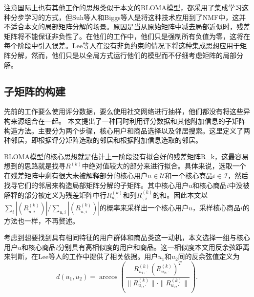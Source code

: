 注意国际上也有其他工作的思想类似于本文的BLOMA模型，都采用了集成学习这种分步学习的方式，但Suh等人和Biggs等人是将这种技术应用到了NMF中，这并不适合本文的局部矩阵分解的场景。原因是当从原始矩阵中减去局部近似时，残差矩阵将不能保证非负性了。在他们的工作中，他们只是强制所有负值为零，这将在每个阶段中引入误差。Lee等人在没有非负约束的情况下将这种集成思想应用于矩阵分解，然而，他们只是以全局方式运行他们的模型而不仔细考虑矩阵的局部分解。

\subsection{子矩阵的构建}
先前的工作要么使用评分数据，要么使用社交网络进行抽样，他们都没有将这些异构来源组合在一起。 本文提出了一种同时利用评分数据和其他附加信息的子矩阵构造方法。主要分为两个步骤，核心用户和商品选择以及邻居搜索。这里定义了两种邻居，即根据评分矩阵选取的邻居和根据附加信息选取的邻居。

BLOMA模型的核心思想就是估计上一阶段没有拟合好的残差矩阵\gls{R_k}，这最容易想到的思路就是找寻$R^{(k)}$中绝对值较大的部分来进行拟合。具体来说，选取一个在残差矩阵中剩有很大未被解释部分的核心用户$u \in \mathcal{U}$和一个核心商品$i \in \mathcal{I}$，然后找寻它们的邻居来构造局部矩阵分解的子矩阵。其中核心用户$u$和核心商品$i$中没被解释的部分被定义为残差矩阵中行$R_{u,\cdot}^{(k)}$和列$R_{\cdot,i}^{(k)}$的和。因此本文以$\sum_i|(R_{u,i}^{(k)})|/\sum_{u,i}|(R_{u,i}^{(k)})|$的概率来采样出一个核心用户$u$，采样核心商品$i$的方法也一样，不再赘述。

考虑到想要找到具有相同特征的用户群体和商品类这一动机，本文选择一组与核心用户$ u $和核心商品$ i $分别具有高相似度的用户和商品。这一相似度本文用反余弦距离来判断，在Lee等人的工作中提供了相关依据。用户$ u_1 $和$ u_2 $间的反余弦值定义为
\begin{equation}
\label{arc-cosine}
d(u_1,u_2) = \arccos(\frac{R_{u_1,\cdot}^{(k)} (R^{(k)}_{u_2,\cdot})^T}{\|R^{(k)}_{u_1,\cdot}\|\cdot\|R^{(k)}_{u_2,\cdot}\|}).
\end{equation}

